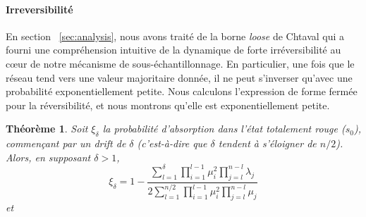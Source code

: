 \documentclass[letterpaper,twocolumn,10pt]{article}
\newcommand\ddfrac[2]{\frac{\displaystyle #1}{\displaystyle #2}}
\newtheorem{theorem}{Théorème}
\theoremstyle{definition}
\begin{document}
\begin{appendices}
\paragraph{Irreversibilité}
En section ~\ref{sec:analysis}, nous avons traité de la borne \emph{loose} %
de Chtaval qui a fourni une compréhension intuitive de la dynamique de forte irréversibilité au cœur de notre mécanisme de sous-échantillonnage. En particulier, une fois que le réseau tend vers une valeur majoritaire donnée, il ne peut s'inverser qu'avec une probabilité exponentiellement petite. Nous calculons l'expression de forme fermée pour la réversibilité, et nous montrons qu'elle est exponentiellement petite.
\begin{theorem}
\label{theorem:slush_prob_convergence_minority}
Soit $\xi_\delta$ la probabilité d'absorption dans l'état totalement rouge ($s_0$), commençant par un drift de $\delta$ (c'est-à-dire que $\delta$ tendent à s'éloigner de $n/2$). Alors, en supposant $\delta > 1$,
\begin{equation}
\xi_\delta = 1 - \ddfrac{\sum_{l = 1}^{\delta} \prod_{i = 1}^{l-1} \mu_i^2 \prod_{j = l}^{n-l}\lambda_j}{2\sum_{l = 1}^{n/2}\prod_{i=1}^{l-1}\mu_i^2\prod_{j=l}^{n-l}\mu_j}
\end{equation}
et
\begin{equation}

\end{equation}
\end{theorem}
\end{appendices}
\end{document}
